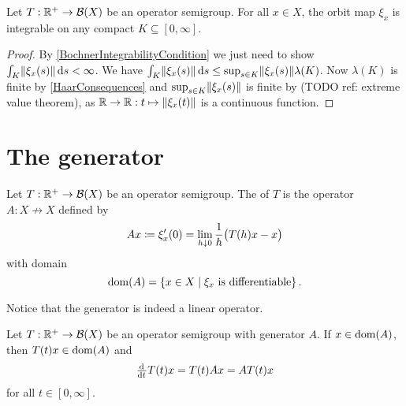 \begin{lemma} \label{integrabilityOrbitMaps}
Let $T: \mathbb{R}^+\to \operatorname{\mathcal{B}}(X)$ be an operator semigroup. For all $x\in X$, the orbit map $\xi_x$ is integrable on any compact $K\subseteq [0,\infty]$.
\end{lemma}
\begin{proof}
By \ref{BochnerIntegrabilityCondition} we just need to show $\int_K\lVert\xi_x(s)\rVert\operatorname{d \!}{s} < \infty$. We have $\int_K\lVert\xi_x(s)\rVert\operatorname{d \!}{s} \leq \sup_{s\in K}\lVert\xi_x(s)\rVert\lambda(K)$. Now $\lambda(K)$ is finite by \ref{HaarConsequences} and $\sup_{s\in K}\lVert\xi_x(s)\rVert$ is finite by (TODO ref: extreme value theorem), as $\mathbb{R} \to \mathbb{R}: t\mapsto \lVert\xi_x(t)\rVert$ is a continuous function.
\end{proof}

\section{The generator}
\begin{definition}
Let $T: \mathbb{R}^+\to \operatorname{\mathcal{B}}(X)$ be an operator semigroup. The  of $T$ is the operator $A: X\not\to X$ defined by
\[ Ax \coloneqq \xi_x'(0) = \lim_{h\downarrow 0}\frac{1}{h}\big(T(h)x - x\big) \]
with domain
\[ \operatorname{dom}(A) = \left\{ x\in X \;\middle|\; \text{$\xi_x$ is differentiable} \right\}. \]
\end{definition}
Notice that the generator is indeed a linear operator.

\begin{lemma} \label{differentialOperatorSemigroupGenerator}
Let $T: \mathbb{R}^+\to \operatorname{\mathcal{B}}(X)$ be an operator semigroup with generator $A$. If $x\in\operatorname{dom}(A)$, then $T(t)x\in\operatorname{dom}(A)$ and
\[ \od{}{t}T(t)x = T(t)Ax = AT(t)x \]
for all $t\in [0,\infty]$.
\end{lemma}

